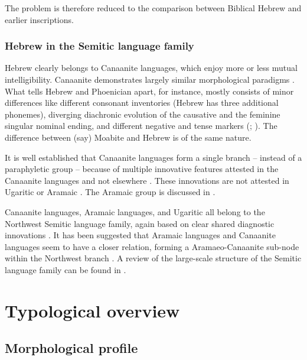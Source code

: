 \documentclass[a4paper, oneside, 12pt]{report}
\newcommand*{\citechap}[1]{Ch~{#1}}
\newcommand*{\citepage}[1]{p.~{#1}}
\newcommand*{\citepages}[1]{pp.~{#1}}
\begin{document}
The problem is therefore reduced to the comparison between Biblical Hebrew and earlier inscriptions.

\subsection{Hebrew in the Semitic language family}

Hebrew clearly belongs to Canaanite languages,
which enjoy more or less mutual intelligibility.
Canaanite demonstrates largely similar morphological paradigms
\citep[\citepages{515-524}]{pat2019semitic}.
What tells Hebrew and Phoenician apart, for instance, mostly consists of minor differences like different consonant inventories (Hebrew has three additional phonemes),
diverging diachronic evolution of the causative and the feminine singular nominal ending,
and different negative and tense markers (\citealt[\citepages{71-76}]{khan2013encyclopedia3}; \citealt[\citepage{513}]{pat2019semitic}).
The difference between (say) Moabite and Hebrew \citep[\citepage{430}]{khan2011semitic} is of the same nature.

It is well established that Canaanite languages form a single branch -- instead of a paraphyletic group --
because of multiple innovative features attested in the Canaanite languages and not elsewhere \citep[\citepages{12,510}]{pat2019semitic}.
These innovations are not attested in Ugaritic or Aramaic \citep[\citepage{460-462,510}]{pat2019semitic}.
The Aramaic group is discussed in \citet{huehnergard1995aramaic}.

Canaanite languages, Aramaic languages, and Ugaritic all belong to the Northwest Semitic language family,
again based on clear shared diagnostic innovations \citep[\citepages{11-13}]{pat2019semitic}.
It has been suggested that Aramaic languages and Canaanite languages seem to have a closer relation, forming a Aramaeo-Canaanite sub-node within the Northwest branch \citep[\citepage{12}]{pat2019semitic}.
A review of the large-scale structure of the Semitic language family can be found in \citet[\citechap{1}]{pat2019semitic}.

\chapter{Typological overview}

\section{Morphological profile}
\end{document}
